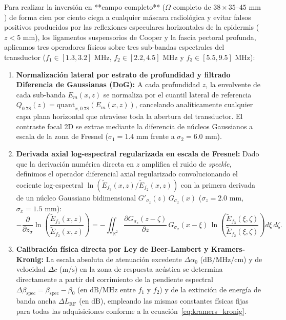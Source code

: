 \documentclass[9pt]{article}
\begin{document}
Para realizar la inversión en **campo completo** ($\Omega$ completo de $38 \times 35\text{--}45\text{ mm}$) de forma cien por ciento ciega a cualquier máscara radiológica y evitar falsos positivos producidos por las reflexiones especulares horizontales de la epidermis ($z < 5\text{ mm}$), los ligamentos suspensorios de Cooper y la fascia pectoral profunda, aplicamos tres operadores físicos sobre tres sub-bandas espectrales del transductor ($f_1 \in [1.3, 3.2]\text{ MHz}$, $f_2 \in [2.2, 4.5]\text{ MHz}$ y $f_3 \in [5.5, 9.5]\text{ MHz}$):
\begin{enumerate}
    \item \textbf{Normalización lateral por estrato de profundidad y filtrado Diferencia de Gaussianas (DoG):} A cada profundidad $z$, la envolvente de cada sub-banda $E_m(x, z)$ se normaliza por el cuantil lateral de referencia $Q_{0.78}(z) = \text{quant}_{x, 0.78}(E_m(x,z))$, cancelando analíticamente cualquier capa plana horizontal que atraviese toda la abertura del transductor. El contraste focal 2D se extrae mediante la diferencia de núcleos Gaussianos a escala de la zona de Fresnel ($\sigma_1 = 1.4\text{ mm}$ frente a $\sigma_2 = 6.0\text{ mm}$).
    \item \textbf{Derivada axial log-espectral regularizada en escala de Fresnel:} Dado que la derivación numérica directa en $z$ amplifica el ruido de \textit{speckle}, definimos el operador diferencial axial regularizado convolucionando el cociente log-espectral $\ln\!\left(\tilde{E}_{f_3}(x,z)/\tilde{E}_{f_2}(x,z)\right)$ con la primera derivada de un núcleo Gaussiano bidimensional $G'_{\sigma_z}(z)\,G_{\sigma_x}(x)$ ($\sigma_z = 2.0\text{ mm}$, $\sigma_x = 1.5\text{ mm}$):
    \begin{equation}
    -\frac{\partial}{\partial z_\sigma}\ln\!\left(\frac{\tilde{E}_{f_3}(x,z)}{\tilde{E}_{f_2}(x,z)}\right) = -\iint_{\mathbb{R}^2} \frac{\partial G_{\sigma_z}(z - \zeta)}{\partial z}\,G_{\sigma_x}(x - \xi)\,\ln\!\left(\frac{\tilde{E}_{f_3}(\xi,\zeta)}{\tilde{E}_{f_2}(\xi,\zeta)}\right)d\xi\,d\zeta.
    \label{eq:fresnel_axial_deriv}
    \end{equation}
    \item \textbf{Calibración física directa por Ley de Beer-Lambert y Kramers-Kronig:} La escala absoluta de atenuación excedente $\Delta\alpha_0$ ($\text{dB/MHz/cm}$) y de velocidad $\Delta c$ ($\text{m/s}$) en la zona de respuesta acústica se determina directamente a partir del corrimiento de la pendiente espectral $\Delta\beta_{\text{spec}} = \beta_{\text{spec}} - \beta_0$ (en $\text{dB/MHz}$ entre $f_1$ y $f_2$) y de la extinción de energía de banda ancha $\Delta L_{\text{RF}}$ (en $\text{dB}$), empleando las mismas constantes físicas fijas para todas las adquisiciones conforme a la ecuación~\eqref{eq:kramers_kronig}.
\end{enumerate}
\end{document}
